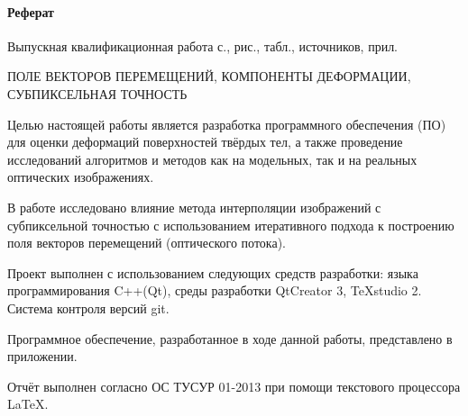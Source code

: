 \newpage
{}
\paragraph{\hfill Реферат \hfill}
Выпускная квалификационная работа  с.,  рис.,  табл.,  источников,  прил.


ПОЛЕ ВЕКТОРОВ ПЕРЕМЕЩЕНИЙ, КОМПОНЕНТЫ ДЕФОРМАЦИИ, СУБПИКСЕЛЬНАЯ ТОЧНОСТЬ

Целью настоящей работы является разработка программного обеспечения (ПО) для оценки деформаций поверхностей твёрдых тел, а также проведение исследований алгоритмов и методов как на модельных, так и на реальных оптических изображениях.

В работе исследовано влияние метода интерполяции изображений с субпиксельной точностью с использованием итеративного подхода к построению поля векторов перемещений (оптического потока).

Проект выполнен с использованием следующих средств разработки: языка программирования C++(Qt), среды разработки QtCreator 3, TeXstudio 2. Система контроля версий git.

Программное обеспечение, разработанное в ходе данной работы, представлено в приложении.

Отчёт выполнен согласно ОС ТУСУР 01-2013 при помощи текстового процессора \LaTeX.